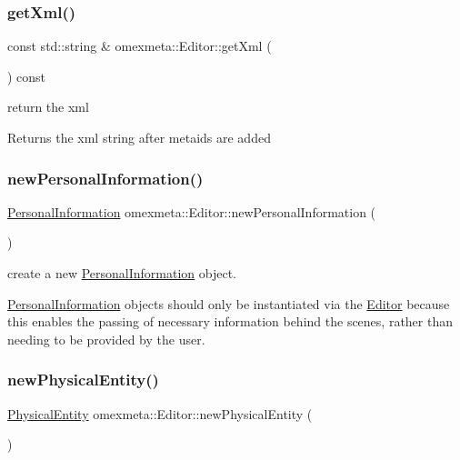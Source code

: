 \subsubsection{\texorpdfstring{get\+Xml()}{getXml()}}
{\footnotesize\ttfamily const std\+::string \& omexmeta\+::\+Editor\+::get\+Xml (\begin{DoxyParamCaption}{ }\end{DoxyParamCaption}) const}



return the xml 

\begin{DoxyReturn}{Returns}
the xml string after metaids are added 
\end{DoxyReturn}
\mbox{\label{classomexmeta_1_1Editor_a1943079ddbc4a4c6d896f51f360a11df}} 
\subsubsection{\texorpdfstring{new\+Personal\+Information()}{newPersonalInformation()}}
{\footnotesize\ttfamily \hyperlink{classomexmeta_1_1PersonalInformation}{Personal\+Information} omexmeta\+::\+Editor\+::new\+Personal\+Information (\begin{DoxyParamCaption}{ }\end{DoxyParamCaption})}



create a new \hyperlink{classomexmeta_1_1PersonalInformation}{Personal\+Information} object. 

\hyperlink{classomexmeta_1_1PersonalInformation}{Personal\+Information} objects should only be instantiated via the \hyperlink{classomexmeta_1_1Editor}{Editor} because this enables the passing of necessary information behind the scenes, rather than needing to be provided by the user. \mbox{\label{classomexmeta_1_1Editor_a245b2105c175892d1fddaf693fa9d636}} 
\subsubsection{\texorpdfstring{new\+Physical\+Entity()}{newPhysicalEntity()}}
{\footnotesize\ttfamily \hyperlink{classomexmeta_1_1PhysicalEntity}{Physical\+Entity} omexmeta\+::\+Editor\+::new\+Physical\+Entity (\begin{DoxyParamCaption}{ }\end{DoxyParamCaption})}



